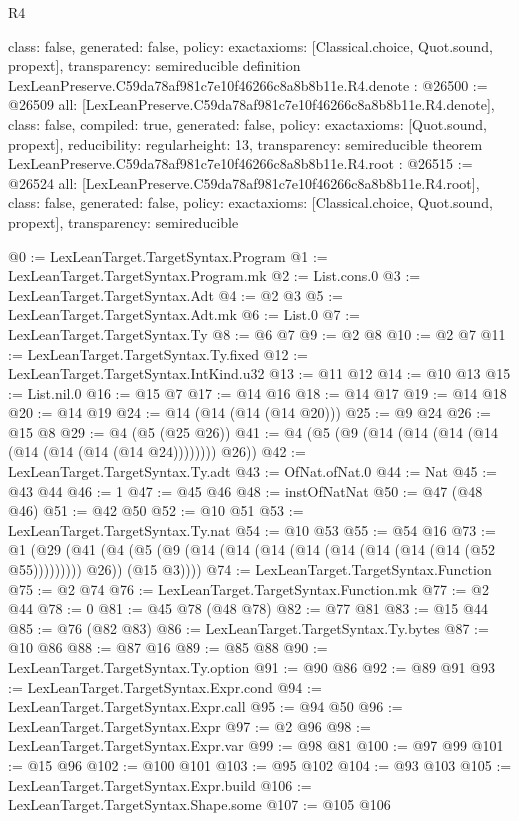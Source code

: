 \begin{lexlean}{R4}
\begin{coremodule}
{  class: false,
  generated: false,
  policy: exact{axioms: [Classical.choice, Quot.sound, propext]},
  transparency: semireducible
}
definition LexLeanPreserve.C59da78af981c7e10f46266c8a8b8b11e.R4.denote : @26500 := @26509 {
  all: [LexLeanPreserve.C59da78af981c7e10f46266c8a8b8b11e.R4.denote],
  class: false,
  compiled: true,
  generated: false,
  policy: exact{axioms: [Quot.sound, propext]},
  reducibility: regular{height: 13},
  transparency: semireducible
}
theorem LexLeanPreserve.C59da78af981c7e10f46266c8a8b8b11e.R4.root : @26515 := @26524 {
  all: [LexLeanPreserve.C59da78af981c7e10f46266c8a8b8b11e.R4.root],
  class: false,
  generated: false,
  policy: exact{axioms: [Classical.choice, Quot.sound, propext]},
  transparency: semireducible
}

@0 := LexLeanTarget.TargetSyntax.Program
@1 := LexLeanTarget.TargetSyntax.Program.mk
@2 := List.cons.{0}
@3 := LexLeanTarget.TargetSyntax.Adt
@4 := @2 @3
@5 := LexLeanTarget.TargetSyntax.Adt.mk
@6 := List.{0}
@7 := LexLeanTarget.TargetSyntax.Ty
@8 := @6 @7
@9 := @2 @8
@10 := @2 @7
@11 := LexLeanTarget.TargetSyntax.Ty.fixed
@12 := LexLeanTarget.TargetSyntax.IntKind.u32
@13 := @11 @12
@14 := @10 @13
@15 := List.nil.{0}
@16 := @15 @7
@17 := @14 @16
@18 := @14 @17
@19 := @14 @18
@20 := @14 @19
@24 := @14 (@14 (@14 (@14 @20)))
@25 := @9 @24
@26 := @15 @8
@29 := @4 (@5 (@25 @26))
@41 := @4 (@5 (@9 (@14 (@14 (@14 (@14 (@14 (@14 (@14 (@14 @24)))))))) @26))
@42 := LexLeanTarget.TargetSyntax.Ty.adt
@43 := OfNat.ofNat.{0}
@44 := Nat
@45 := @43 @44
@46 := 1
@47 := @45 @46
@48 := instOfNatNat
@50 := @47 (@48 @46)
@51 := @42 @50
@52 := @10 @51
@53 := LexLeanTarget.TargetSyntax.Ty.nat
@54 := @10 @53
@55 := @54 @16
@73 := @1
    (@29
      (@41 (@4 (@5 (@9 (@14 (@14 (@14 (@14 (@14 (@14 (@14 (@14 (@52 @55))))))))) @26)) (@15 @3))))
@74 := LexLeanTarget.TargetSyntax.Function
@75 := @2 @74
@76 := LexLeanTarget.TargetSyntax.Function.mk
@77 := @2 @44
@78 := 0
@81 := @45 @78 (@48 @78)
@82 := @77 @81
@83 := @15 @44
@85 := @76 (@82 @83)
@86 := LexLeanTarget.TargetSyntax.Ty.bytes
@87 := @10 @86
@88 := @87 @16
@89 := @85 @88
@90 := LexLeanTarget.TargetSyntax.Ty.option
@91 := @90 @86
@92 := @89 @91
@93 := LexLeanTarget.TargetSyntax.Expr.cond
@94 := LexLeanTarget.TargetSyntax.Expr.call
@95 := @94 @50
@96 := LexLeanTarget.TargetSyntax.Expr
@97 := @2 @96
@98 := LexLeanTarget.TargetSyntax.Expr.var
@99 := @98 @81
@100 := @97 @99
@101 := @15 @96
@102 := @100 @101
@103 := @95 @102
@104 := @93 @103
@105 := LexLeanTarget.TargetSyntax.Expr.build
@106 := LexLeanTarget.TargetSyntax.Shape.some
@107 := @105 @106

\end{coremodule}
\end{lexlean}
